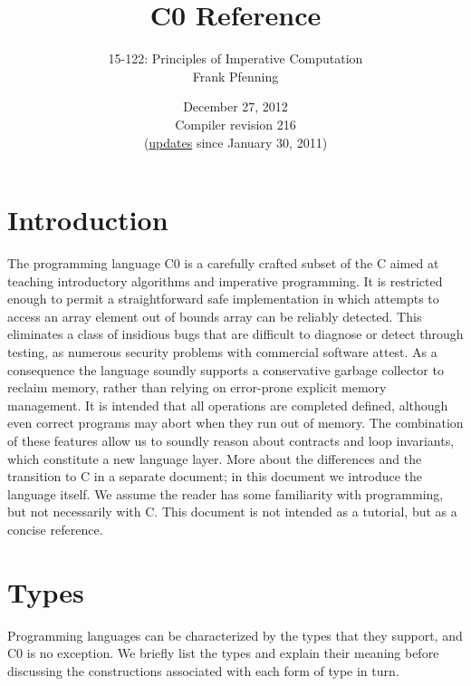 \documentclass[11pt]{article}
\title{C0 Reference}
\author{15-122: Principles of Imperative Computation \\ Frank Pfenning}
\date{December 27, 2012\\Compiler revision 216\\
  (\hyperlink{sec:updates}{updates} since January 30, 2011)}
\begin{document}
\maketitle

\section{Introduction}

The programming language C0 is a carefully crafted subset of the C
aimed at teaching introductory algorithms and imperative programming.
It is restricted enough to permit a straightforward safe
implementation in which attempts to access an array element out of
bounds array can be reliably detected.  This eliminates a class of
insidious bugs that are difficult to diagnose or detect through
testing, as numerous security problems with commercial software
attest.  As a consequence the language soundly supports a conservative
garbage collector to reclaim memory, rather than relying on
error-prone explicit memory management.  It is intended that all
operations are completed defined, although even correct programs may
abort when they run out of memory.  The combination of these features
allow us to soundly reason about contracts and loop invariants, which
constitute a new language layer.  More about the differences and the
transition to C in a separate document; in this document we introduce
the language itself.  We assume the reader has some familiarity with
programming, but not necessarily with C\@.  This document is not intended
as a tutorial, but as a concise reference.

\section{Types}

Programming languages can be characterized by the types that they support,
and C0 is no exception.  We briefly list the types and explain their
meaning before discussing the constructions associated with each
form of type in turn.
\end{document}
